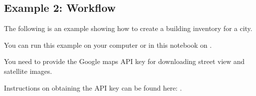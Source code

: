 \documentclass[letterpaper,10pt,english]{sphinxmanual}
\begin{document}
\begin{quote}
\begin{sphinxVerbatim}[commandchars=\\\{\}]
  


  \PYG{p}{[}
        \PYG{p}{]}

  
\end{sphinxVerbatim}
\end{quote}


\subsection{Example 2: Workflow}
\label{\detokenize{common/user_manual/examples:example-2-workflow}}
\sphinxAtStartPar
The following is an example showing how to create a building inventory for a city.

\sphinxAtStartPar
You can run this example on your computer or in this notebook on .

\sphinxAtStartPar
You need to provide the Google maps API key for downloading street view and satellite images.

\sphinxAtStartPar
Instructions on obtaining the API key can be found here: .
\end{document}
